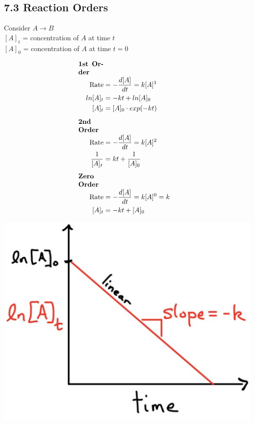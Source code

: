 \subsection{7.3 Reaction Orders}
\vspace*{0.3em}
Consider $A \longrightarrow B$\\
$[A]_t$ = concentration of $A$ at time $t$\\
$[A]_0$ = concentration of $A$ at time $t=0$

\vspace*{-1em}
\begin{minipage}{0.99\linewidth}
    \begin{minipage}{0.65\linewidth}
        \begin{align*}
            \parbox{1.3cm}{\textbf{1st Order}}\\
            \text{Rate} &= -\frac{d[A]}{d t} = k[A]^1 \\
            ln[A]_t &= -k t + ln[A]_0\\
            [A]_t& = [A]_0 \cdot exp(-k t)
            \\[0.5em]
            \parbox{1.3cm}{\textbf{2nd Order}}\\
            \text{Rate} &= -\frac{d[A]}{d t} = k[A]^2 \\
            \frac{1}{[A]_t} &= k t + \frac{1}{[A]_0}
            \\[0.5em]
            \parbox{1.3cm}{\textbf{Zero Order}}\\
            \text{Rate} &= -\frac{d[A]}{d t} = k[A]^0 = k \\
            [A]_t &= -k t + [A]_0 \\
        \end{align*}
    \end{minipage}
    \begin{minipage}{0.34\linewidth}
        \vspace{2.5em}

        \includegraphics[width=0.9\linewidth]{src/7_Kinetics/images/1st_order.pdf}


\end{minipage}
\end{minipage}
